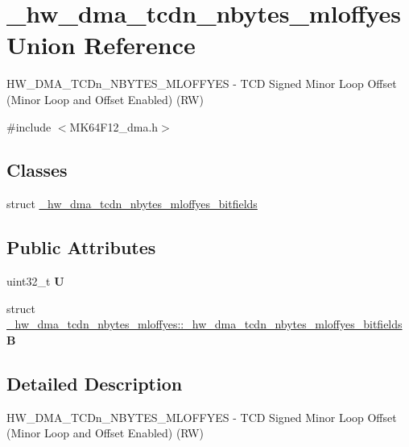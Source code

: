 \hypertarget{union__hw__dma__tcdn__nbytes__mloffyes}{}\section{\+\_\+hw\+\_\+dma\+\_\+tcdn\+\_\+nbytes\+\_\+mloffyes Union Reference}
\label{union__hw__dma__tcdn__nbytes__mloffyes}


H\+W\+\_\+\+D\+M\+A\+\_\+\+T\+C\+Dn\+\_\+\+N\+B\+Y\+T\+E\+S\+\_\+\+M\+L\+O\+F\+F\+Y\+ES -\/ T\+CD Signed Minor Loop Offset (Minor Loop and Offset Enabled) (RW)  




{\ttfamily \#include $<$M\+K64\+F12\+\_\+dma.\+h$>$}

\subsection*{Classes}
\begin{DoxyCompactItemize}
\item 
struct \hyperlink{struct__hw__dma__tcdn__nbytes__mloffyes_1_1__hw__dma__tcdn__nbytes__mloffyes__bitfields}{\+\_\+hw\+\_\+dma\+\_\+tcdn\+\_\+nbytes\+\_\+mloffyes\+\_\+bitfields}
\end{DoxyCompactItemize}
\subsection*{Public Attributes}
\begin{DoxyCompactItemize}
\item 
uint32\+\_\+t {\bfseries U}\hypertarget{union__hw__dma__tcdn__nbytes__mloffyes_a14c2d093bc88aab95e86c0d0db200da0}{}\label{union__hw__dma__tcdn__nbytes__mloffyes_a14c2d093bc88aab95e86c0d0db200da0}

\item 
struct \hyperlink{struct__hw__dma__tcdn__nbytes__mloffyes_1_1__hw__dma__tcdn__nbytes__mloffyes__bitfields}{\+\_\+hw\+\_\+dma\+\_\+tcdn\+\_\+nbytes\+\_\+mloffyes\+::\+\_\+hw\+\_\+dma\+\_\+tcdn\+\_\+nbytes\+\_\+mloffyes\+\_\+bitfields} {\bfseries B}\hypertarget{union__hw__dma__tcdn__nbytes__mloffyes_aa72c27532ea072195a0515973ebf7d2e}{}\label{union__hw__dma__tcdn__nbytes__mloffyes_aa72c27532ea072195a0515973ebf7d2e}

\end{DoxyCompactItemize}


\subsection{Detailed Description}
H\+W\+\_\+\+D\+M\+A\+\_\+\+T\+C\+Dn\+\_\+\+N\+B\+Y\+T\+E\+S\+\_\+\+M\+L\+O\+F\+F\+Y\+ES -\/ T\+CD Signed Minor Loop Offset (Minor Loop and Offset Enabled) (RW) 

